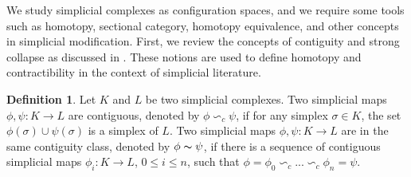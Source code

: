 \documentclass[preprint,11pt %
]{hjm1}
\theoremstyle{definition}
\newtheorem{definition}[theorem]{Definition}
\begin{document}
\begin{figure}[!ht]
\centering
\parbox{5cm}{
}
\parbox{2.5cm}{
}
\end{figure}




We study simplicial complexes as configuration spaces, and we require some tools such as homotopy, sectional category, homotopy equivalence, and other concepts in simplicial modification. First, we review the concepts of contiguity and strong collapse as discussed in \cite{Fer}. These notions are used to define homotopy and contractibility in the context of simplicial literature.

\begin{definition}
Let $K$ and $L$ be two simplicial complexes. 
Two simplicial maps $\phi ,\psi :K\to L$ are contiguous, denoted by $\phi \backsim _c \psi$, if for any simplex $\sigma \in K$, the set $\phi (\sigma )\cup \psi (\sigma )$ is a simplex of $L$. Two simplicial maps $\phi ,\psi :K\to L$ are in the same contiguity class, denoted by $\phi \thicksim \psi$, if there is a sequence
of contiguous simplicial maps $\phi _i:K\to L$, $0\leq i\leq n$, such that
$
\phi =\phi _0 \backsim _c ... \backsim _c \phi _n=\psi
$.
\end{definition}
\end{document}
